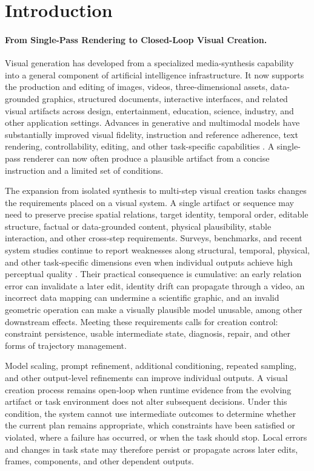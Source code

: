 \section{Introduction}
\label{sec:introduction}

\paragraph{From Single-Pass Rendering to Closed-Loop Visual Creation.}
Visual generation has developed from a specialized media-synthesis capability into a general component of artificial intelligence infrastructure. It now supports the production and editing of images, videos, three-dimensional assets, data-grounded graphics, structured documents, interactive interfaces, and related visual artifacts across design, entertainment, education, science, industry, and other application settings. Advances in generative and multimodal models have substantially improved visual fidelity, instruction and reference adherence, text rendering, controllability, editing, and other task-specific capabilities \cite{he2024llms,yang2025textimage,wang2025imageediting,yin2025spatiotemporal}. A single-pass renderer can now often produce a plausible artifact from a concise instruction and a limited set of conditions.

The expansion from isolated synthesis to multi-step visual creation tasks changes the requirements placed on a visual system. A single artifact or sequence may need to preserve precise spatial relations, target identity, temporal order, editable structure, factual or data-grounded content, physical plausibility, stable interaction, and other cross-step requirements. Surveys, benchmarks, and recent system studies continue to report weaknesses along structural, temporal, physical, and other task-specific dimensions even when individual outputs achieve high perceptual quality \cite{wu2026visualgeneration,yin2025spatiotemporal,avg250925229,feng2026newton}. Their practical consequence is cumulative: an early relation error can invalidate a later edit, identity drift can propagate through a video, an incorrect data mapping can undermine a scientific graphic, and an invalid geometric operation can make a visually plausible model unusable, among other downstream effects. Meeting these requirements calls for creation control: constraint persistence, usable intermediate state, diagnosis, repair, and other forms of trajectory management.

Model scaling, prompt refinement, additional conditioning, repeated sampling, and other output-level refinements can improve individual outputs. A visual creation process remains open-loop when runtime evidence from the evolving artifact or task environment does not alter subsequent decisions. Under this condition, the system cannot use intermediate outcomes to determine whether the current plan remains appropriate, which constraints have been satisfied or violated, where a failure has occurred, or when the task should stop. Local errors and changes in task state may therefore persist or propagate across later edits, frames, components, and other dependent outputs.

